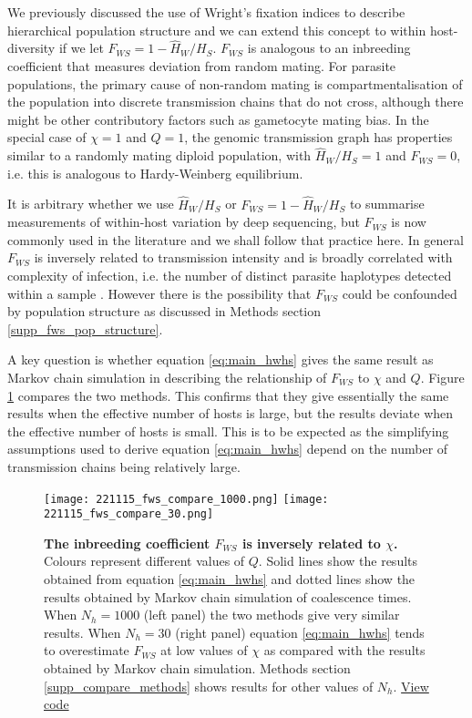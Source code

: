 \documentclass[_main.tex]{subfiles}
\begin{document}
We previously discussed the use of Wright's fixation indices to describe hierarchical population structure and we can extend this concept to within host-diversity if we let $F_{WS} = 1 - \widehat{H}_W / H_S$.  $F_{WS}$ is analogous to an inbreeding coefficient that measures deviation from random mating.  For parasite populations, the primary cause of non-random mating is compartmentalisation of the population into discrete transmission chains that do not cross, although there might be other contributory factors such as gametocyte mating bias.  In the special case of $\chi = 1$ and $Q = 1$, the genomic transmission graph has properties similar to a randomly mating diploid population, with $\widehat{H}_W / H_S = 1$ and $F_{WS} = 0$, i.e. this is analogous to Hardy-Weinberg equilibrium.

It is arbitrary whether we use $\widehat{H}_W / H_S$ or $F_{WS} = 1 - \widehat{H}_W / H_S$ to summarise measurements of within-host variation by deep sequencing, but $F_{WS}$ is now commonly used in the literature and we shall follow that practice here.  In general $F_{WS}$ is inversely related to transmission intensity \cite{Auburn2012,Manske2012,MalariaGEN2021} and is broadly correlated with complexity of infection, i.e. the number of distinct parasite haplotypes detected within a sample \cite{Auburn2012}.  However there is the possibility that $F_{WS}$ could be confounded by population structure as discussed in Methods section \ref{supp_fws_pop_structure}.

A key question is whether equation \ref{eq:main_hwhs} gives the same result as Markov chain simulation in describing the relationship of $F_{WS}$ to $\chi$ and $Q$.  Figure \ref{fig:main_fws_compare_methods} compares the two methods.  This confirms that they give essentially the same results when the effective number of hosts is large, but the results deviate when the effective number of hosts is small.  This is to be expected as the simplifying assumptions used to derive equation \ref{eq:main_hwhs} depend on the number of transmission chains being relatively large.


\begin{figure}[h!]
\centering
\texttt{[image: 221115\_fws\_compare\_1000.png]}
\texttt{[image: 221115\_fws\_compare\_30.png]}
\caption{\textbf{The inbreeding coefficient $F_{WS}$ is inversely related to $\chi$.}  Colours represent different values of $Q$.  Solid lines show the results obtained from equation \ref{eq:main_hwhs} and dotted lines show the results obtained by Markov chain simulation of coalescence times.  When $N_h=1000$ (left panel) the two methods give very similar results.  When $N_h = 30$ (right panel) equation \ref{eq:main_hwhs} tends to overestimate $F_{WS}$ at low values of $\chi$ as compared with the results obtained by Markov chain simulation.  Methods section \ref{supp_compare_methods} shows results for other values of $N_h$.
\href{https://github.com/d-kwiat/gtg/blob/main/fws_compare_methods.ipynb}{View code}
}
\label{fig:main_fws_compare_methods}
\end{figure}
\end{document}
